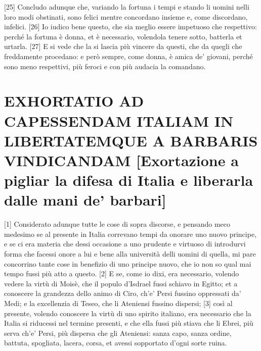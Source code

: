 {[}25{]} Concludo adunque che, variando la fortuna i tempi e stando li
uomini nelli loro modi obstinati, sono felici mentre concordano insieme
e, come discordano, infelici. {[}26{]} Io iudico bene questo, che sia
meglio essere impetuoso che respettivo: perché la fortuna è donna, et è
necessario, volendola tenere sotto, batterla et urtarla. {[}27{]} E si
vede che la si lascia più vincere da questi, che da quegli che
freddamente procedano: e però sempre, come donna, è amica de' giovani,
perché sono meno respettivi, più feroci e con più audacia la comandano.

\quebra\section{EXHORTATIO AD CAPESSENDAM ITALIAM IN LIBERTATEMQUE A BARBARIS VINDICANDAM
{[}Exortazione a pigliar la difesa di Italia e liberarla dalle mani de' barbari{]}}

{[}1{]} Considerato adunque tutte le cose di sopra discorse, e pensando meco medesimo se al presente in Italia correvano tempi da onorare uno nuovo principe, e se ci era materia che dessi occasione a uno prudente e virtuoso di introdurvi forma che facessi onore a lui e bene alla università delli uomini di quella, mi pare concorrino tante cose in benefizio di uno principe nuovo, che io non so qual mai tempo fussi più atto a questo. {[}2{]} E se, come io dixi, era necessario, volendo vedere la virtù di Moisè, che il populo d'Isdrael fussi schiavo in Egitto; et a conoscere la grandezza dello animo di Ciro, ch'e' Persi fussino oppressati da' Medi; e la excellenzia di Teseo, che li Ateniensi fussino dispersi; {[}3{]} così al presente, volendo conoscere la virtù di uno spirito italiano, era necessario che la Italia si riducessi nel termine presenti, e che ella fussi più stiava che li Ebrei, più serva ch'e' Persi, più dispersa che gli Ateniensi: sanza capo, sanza ordine, battuta, spogliata, lacera, corsa, et avessi sopportato d'ogni sorte ruina.


